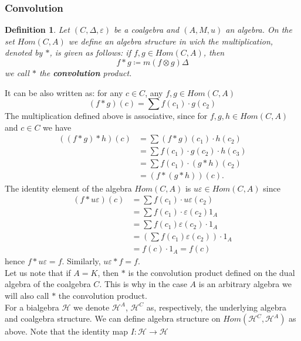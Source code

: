 \documentclass[a4paper, 12pt]{article}
\newtheorem{definition}{Definition}
\begin{document}
\subsubsection{Convolution}
\begin{definition}
Let $(C, \Delta, \varepsilon)$ be a coalgebra and $(A, M, u)$ an algebra. On the set $Hom(C, A)$ we define
an algebra structure in wich the multiplication, denoted by $*$, is given as follows: if
$f, g \in Hom(C, A)$, then
\begin{equation*}
f*g \coloneqq m(f \otimes g)\Delta
\end{equation*}
we call $*$ the \textbf{convolution} product.
\end{definition}
It can be also written as: for any $c \in C$, any $f, g \in Hom(C, A)$
\begin{equation*}
(f*g)(c) = \sum f(c_1) \cdot g(c_2)
\end{equation*}
The multiplication defined above is associative, since for $f, g, h \in Hom(C, A)$ and
$c \in C$ we have
\begin{align*}
((f*g)*h)(c) &= \sum(f*g)(c_1)\cdot h(c_2) \\
&= \sum f(c_1) \cdot g(c_2) \cdot h(c_3) \\
&= \sum f(c_1) \cdot (g*h)(c_2) \\
&= (f*(g*h))(c).
\end{align*}
The identity element of the algebra $Hom(C, A)$ is $u\varepsilon \in Hom(C, A)$ since
\begin{align*}
(f * u\varepsilon)(c) &= \sum f(c_1) \cdot u\varepsilon(c_2) \\
&= \sum f(c_1) \cdot \varepsilon(c_2)1_A \\
&= \sum f(c_1)\varepsilon(c_2) \cdot 1_A \\
&= \left(\sum f(c_1)\varepsilon(c_2)\right)\cdot 1_A \\
&= f(c) \cdot 1_A = f(c)
\end{align*}
hence $f * u\varepsilon = f$. Similarly, $u\varepsilon * f = f$. \\
Let us note that if $A = K$, then $*$ is the convolution product defined on the dual algebra of the
coalgebra $C$. This is why in the case $A$ is an arbitrary algebra we will also call $*$ the convolution
product. \\[8pt]
\indent For a bialgebra $\mathcal{H}$ we denote $\mathcal{H}^A$, $\mathcal{H}^C$ as, respectively,
the underlying algebra and coalgebra structure. We can define algebra structure on
$Hom(\mathcal{H}^C, \mathcal{H}^A)$ as above. Note that the identity map $I : \mathcal{H} \to \mathcal{H}$
\end{document}
